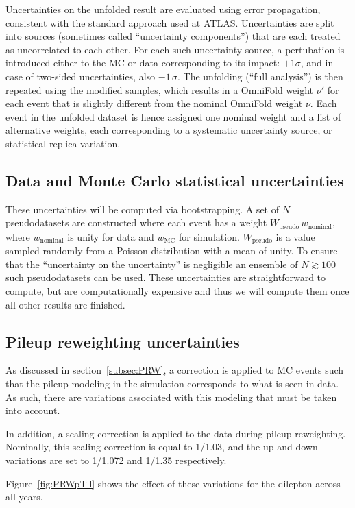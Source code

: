 Uncertainties on the unfolded result are evaluated using error propagation, consistent with the standard approach used at ATLAS.
Uncertainties are split into sources (sometimes called ``uncertainty components'') that are each treated as uncorrelated to each other.
For each such uncertainty source, a pertubation is introduced either to the MC or data corresponding to its impact: $+1\sigma$, and in case of two-sided uncertainties, also $-1\,\sigma$. The unfolding (``full analysis'') is then repeated using the modified samples, which results in a OmniFold weight $\nu'$ for each event that is slightly different from the nominal OmniFold weight $\nu$. Each event in the unfolded dataset is hence assigned one nominal weight and a list of alternative weights, each corresponding to a systematic uncertainty source, or statistical replica variation.

\subsection{Data and Monte Carlo statistical uncertainties}
These uncertainties will be computed via bootstrapping.  A set of $N$ pseudodatasets are constructed where each event has a weight $W_\text{pseudo}\,w_\text{nominal}$, where $w_\text{nominal}$ is unity for data and $w_\text{MC}$ for simulation. $W_\text{pseudo}$ is a value sampled randomly from a Poisson distribution with a mean of unity.  To ensure that the ``uncertainty on the uncertainty'' is negligible an ensemble of $N\gtrsim 100$ such pseudodatasets can be used.  These uncertainties are straightforward to compute, but are computationally expensive and thus we will compute them once all other results are finished.

\subsection{Pileup reweighting uncertainties}
As discussed in section~\ref{subsec:PRW}, a correction is applied to MC events such that the pileup modeling in the simulation corresponds to what is seen in data. As such, there are variations associated with this modeling
that must be taken into account.

In addition, a scaling correction is applied to the data during pileup reweighting. Nominally, this scaling correction is equal to 1/1.03, and the up and down variations are set to 1/1.072 and 1/1.35 respectively.

Figure~\ref{fig:PRWpTll} shows the effect of these variations for the dilepton \pt across all years.

